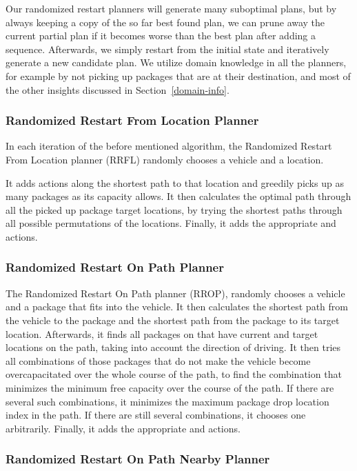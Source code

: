 Our randomized restart planners will generate many suboptimal plans,
but by always keeping a copy of the so far best found plan,
we can prune away the current partial plan if it becomes
worse than the best plan after adding a sequence.
Afterwards, we simply restart
from the initial state and iteratively generate a new candidate plan.
We utilize domain knowledge in all the planners,
for example by not picking up packages that are at their destination,
and most of the other insights discussed in Section~\ref{domain-info}.

\subsubsection{Randomized Restart From Location Planner}\label{rrfl}

In each iteration of the before mentioned algorithm,
the Randomized Restart From Location planner (RRFL)
randomly chooses a vehicle and a location.

It adds \drive{} actions along the shortest path
to that location and greedily picks up as many packages as
its capacity allows.
It then calculates the optimal
path through all the picked up package target locations,
by trying the shortest paths through all possible permutations
of the locations.
Finally, it adds the appropriate \drive{} and \drop{} actions.

\subsubsection{Randomized Restart On Path Planner}\label{rrop}

The Randomized Restart On Path planner (RROP),
randomly chooses a vehicle
and a package that fits into the vehicle.
It then calculates the shortest path from the vehicle
to the package
and the shortest path from the package to its target location.
Afterwards, it finds all packages on that have current and target locations on the path, taking into account the direction of driving.
It then tries all combinations of
those packages that do not make the vehicle become
overcapacitated over the whole course
of the path,
to find the combination that minimizes the minimum
free capacity over the course of the path.
If there are several such combinations, it minimizes the
maximum package drop location index in the path.
If there are still several combinations, it chooses one arbitrarily.
Finally, it adds the appropriate \drive{} and \drop{} actions.

\subsubsection{Randomized Restart On Path Nearby Planner}\label{rropn}

